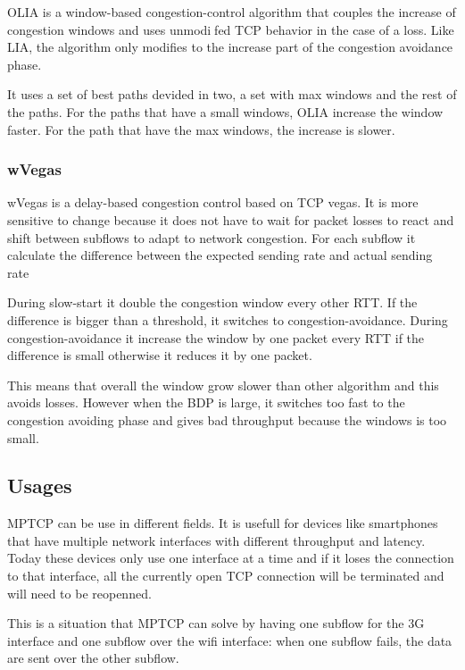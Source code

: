   OLIA is a window-based congestion-control algorithm that couples the increase of congestion windows and uses unmodifed TCP behavior in the case of a loss.
  Like LIA, the algorithm only modifies to the increase part of the congestion avoidance phase.

  It uses a set of best paths devided in two, a set with max windows and the rest of the paths. For the paths that have a small windows, OLIA increase the window faster.
  For the path that have the max windows, the increase is slower.

  \subsubsection{ wVegas } \label{sec:wvegas}

  wVegas is a delay-based congestion control based on TCP vegas. It is more sensitive to change because it does not have to wait for packet losses to react and shift between subflows to adapt to network congestion.
  For each subflow it calculate the difference between the expected sending rate and actual sending rate

  During slow-start it double the congestion window every other RTT. If the difference is bigger than a threshold, it switches to congestion-avoidance.
  During congestion-avoidance it increase the window by one packet every RTT if the difference is small otherwise it reduces it by one packet.

  This means that overall the window grow slower than other algorithm and this avoids losses. However when the BDP is large, it switches too fast to the congestion avoiding phase and gives
  bad throughput because the windows is too small.

  \subsection{Usages}

  MPTCP can be use in different fields. It is usefull for devices like smartphones that have multiple network interfaces with different throughput and latency. Today these devices only use one interface at a time and
  if it loses the connection to that interface, all the currently open TCP connection will be terminated and will need to be reopenned.

  This is a situation that MPTCP can solve by having one subflow for the 3G interface and one subflow over the wifi interface: when one subflow fails, the data are sent over the other subflow.

